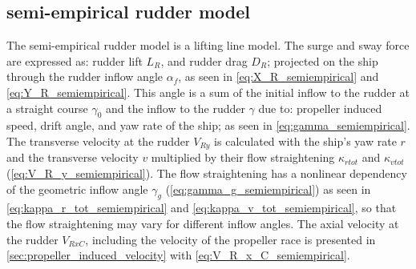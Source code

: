 \subsection{semi-empirical rudder model}
\label{sec:semiempirical_rudder_model}
The semi-empirical rudder model is a lifting line model. The surge and sway force are expressed as: rudder lift $L_R$, and rudder drag $D_R$; projected on the ship through the rudder inflow angle $\alpha_f$, as seen in \autoref{eq:X_R_semiempirical} and \autoref{eq:Y_R_semiempirical}.
This angle is a sum of the initial inflow to the rudder at a straight course $\gamma_0$ and the inflow to the rudder $\gamma$ due to: propeller induced speed, drift angle, and yaw rate of the ship; as seen in \autoref{eq:gamma_semiempirical}.
\begin{equation}
    \label{eq:X_R_semiempirical}
    
\end{equation}
%
\begin{equation}
    \label{eq:Y_R_semiempirical}
    
\end{equation}
%
\begin{equation}
    \label{eq:alpha_f_semiempirical}
    
\end{equation}
%
\begin{equation}
    \label{eq:gamma_semiempirical}
    
\end{equation}
The transverse velocity at the rudder $V_{Ry}$ is calculated with the ship's yaw rate $r$ and the transverse velocity $v$ multiplied by their flow straightening $\kappa_{rtot}$ and $\kappa_{vtot}$ (\autoref{eq:V_R_y_semiempirical}). The flow straightening has a nonlinear dependency of the geometric inflow angle $\gamma_g$ (\autoref{eq:gamma_g_semiempirical}) as seen in \autoref{eq:kappa_r_tot_semiempirical} and \autoref{eq:kappa_v_tot_semiempirical}, so that the flow straightening may vary for different inflow angles.
The axial velocity at the rudder $V_{RxC}$, including the velocity of the propeller race is presented in \autoref{sec:propeller_induced_velocity} with \autoref{eq:V_R_x_C_semiempirical}.
\begin{equation}
    \label{eq:V_R_y_semiempirical}
    
\end{equation}
%
\begin{equation}
    \label{eq:kappa_r_tot_semiempirical}
    
\end{equation}
%
\begin{equation}
    \label{eq:kappa_v_tot_semiempirical}
    
\end{equation}
%
\begin{equation}
    \label{eq:gamma_g_semiempirical}
    
\end{equation}

